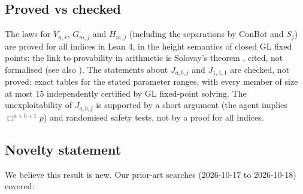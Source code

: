 \documentclass{article}
\begin{document}
\subsection*{Proved vs checked}

The laws for $V_{n,r}$, $G_{m,j}$ and $H_{m,j}$ (including the separations by ConBot and $S_j$)
are proved for all indices in Lean 4, in the height semantics of closed GL fixed points; the link
to provability in arithmetic is Solovay's theorem \cite{solovay1976provability}, cited, not
formalised (see also \cite{boolos1993logic}). The statements about $J_{a,b,j}$ and $J_{1,1,1}$ are
checked, not proved: exact tables for the stated parameter ranges, with every member of size at
most 15 independently certified by GL fixed-point solving. The unexploitability of $J_{a,b,j}$ is
supported by a short argument (the agent implies $\Box^{a+b+1}p$) and randomised safety tests,
not by a proof for all indices.

\subsection*{Novelty statement}

We believe this result is new. Our prior-art searches (2026-10-17 to 2026-10-18) covered:
\end{document}
